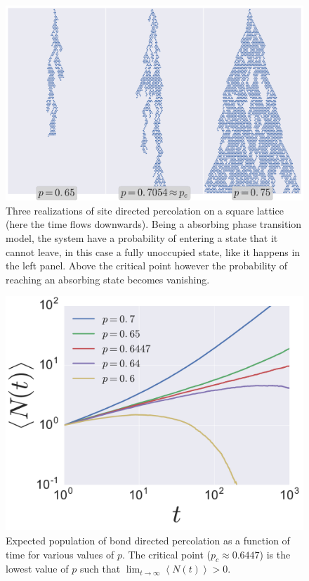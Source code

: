 \begin{figure}
\begin{center}
    \includegraphics[scale=0.5]{chapters/ch5-anis/figs/dperco}
\end{center}
\caption{Three realizations of site directed percolation on a square lattice
    (here the time flows downwards). Being a absorbing phase transition model,
    the system have a probability of entering a state that it cannot leave, in
    this case a fully unoccupied state, like it happens in the left panel.
    Above the critical point however the probability of reaching an absorbing
    state becomes vanishing.}
\label{fig:dperco}
\end{figure}

\begin{figure}
\begin{center}
    \includegraphics[scale=0.5]{chapters/ch5-anis/figs/dperco_nt}
\end{center}
\caption{Expected population of bond directed percolation as a function of time
    for various values of $p$. The critical point ($p_c\approx0.6447$) is the
    lowest value of $p$ such that $\lim_{t\rightarrow\infty}\left\langle
    N(t)\right\rangle>0$.}
\label{fig:dperco_nt}
\end{figure}
